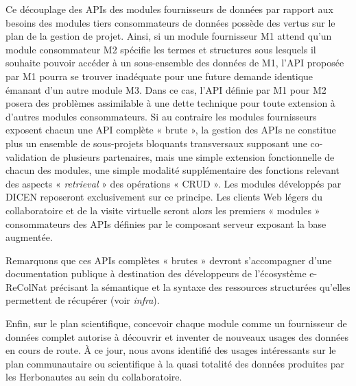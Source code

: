 Ce découplage des APIs des modules fournisseurs de données par rapport aux besoins des modules tiers consommateurs de données possède des vertus sur le plan de la gestion de projet.
Ainsi, si un module fournisseur M1 attend qu'un module consommateur M2 spécifie les termes et structures sous lesquels il souhaite pouvoir accéder à un sous-ensemble des données de M1, l'API proposée par M1 pourra se trouver inadéquate pour une future demande identique émanant d'un autre module M3.
Dans ce cas, l'API définie par M1 pour M2 posera des problèmes assimilable à une dette technique pour toute extension à d'autres modules consommateurs.
Si au contraire les modules fournisseurs exposent chacun une API complète « brute », la gestion des APIs ne constitue plus un ensemble de sous-projets bloquants transversaux supposant une co-validation de plusieurs partenaires, mais une simple extension fonctionnelle de chacun des modules, une simple modalité supplémentaire des fonctions relevant des aspects « {\it retrieval} » des opérations « CRUD ».
Les modules développés par DICEN reposeront exclusivement sur ce principe.
Les clients Web légers du collaboratoire et de la visite virtuelle seront alors les premiers « modules » consommateurs des APIs définies par le composant serveur exposant la base augmentée.

Remarquons que ces APIs complètes « brutes » devront s'accompagner d'une documentation publique à destination des développeurs de l'écosystème e-ReColNat précisant la sémantique et la syntaxe des ressources structurées qu'elles permettent de récupérer (voir {\it infra}).

Enfin, sur le plan scientifique, concevoir chaque module comme un fournisseur de données complet autorise à découvrir et inventer de nouveaux usages des données en cours de route.
À ce jour, nous avons identifié des usages intéressants sur le plan communautaire ou scientifique à la quasi totalité des données produites par les Herbonautes au sein du collaboratoire.